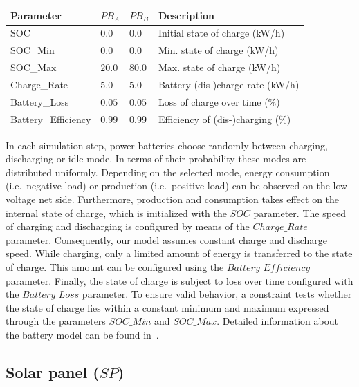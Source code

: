 \begin{table}[h]
	\renewcommand{\arraystretch}{1.3}
	\centering
	\begin{tabularx}{\columnwidth}{lllX}
		\hline
		\textbf{Parameter}     & \textbf{$PB_{A}$} & \textbf{$PB_{B}$} & \textbf{Description} \\ \hline
		SOC                     & $0.0$ & $0.0$ & Initial state of charge (kW/h)                   \\
		SOC\_Min                & $0.0$ & $0.0$ & Min. state of charge (kW/h)                   \\
		SOC\_Max               & $20.0$ & $80.0$ &  Max. state of charge (kW/h)                    \\
		Charge\_Rate            & $5.0$ & $5.0$ & Battery (dis-)charge rate (kW/h)     \\ 
		Battery\_Loss           & $0.05$ & $0.05$ & Loss of charge over time (\%)\\
		Battery\_Efficiency      & $0.99$ & $0.99$ &Efficiency of (dis-)charging (\%)     \\ \hline
	\end{tabularx}
\end{table}

In each simulation step, power batteries choose randomly between charging, discharging or idle mode. In terms of their probability these modes are distributed uniformly. Depending on the selected mode, energy consumption (i.e.\ negative load) or production (i.e.\ positive load) can be observed on the low-voltage net side. Furthermore, production and consumption takes effect on the internal state of charge, which is initialized with the $SOC$ parameter. The speed of charging and discharging is configured by means of the $Charge\_Rate$ parameter. Consequently, our model assumes constant charge and discharge speed. While charging, only a limited amount of energy is transferred to the state of charge. This amount can be configured using the $Battery\_Efficiency$ parameter. Finally, the state of charge is subject to loss over time configured with the $Battery\_Loss$ parameter. To ensure valid behavior, a constraint tests whether the state of charge lies within a constant minimum and maximum expressed through the parameters $SOC\_Min$ and $SOC\_Max$. Detailed information about the battery model can be found in~\cite{hackenberg2014rapid}.

\subsection{Solar panel ($SP$)}


